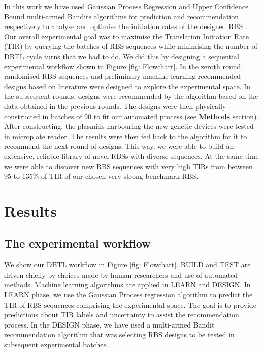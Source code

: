 \documentclass{article}
\begin{document}
In this work we have used Gaussian Process Regression \cite{Rasmussen2004} and Upper Confidence Bound multi-armed Bandits algorithms \cite{desautels2014parallelizing} for prediction and recommendation respectively to analyse and optimise the initiation rates of the designed RBS .
Our overall experimental goal was to maximise the Translation Initiation Rate (TIR) by querying the batches of RBS sequences while minimising the number of DBTL cycle turns that we had to do.
We did this by designing a sequential experimental workflow shown in Figure \ref{fig: Flowchart}.
In the zeroth round, randomised RBS sequences and preliminary machine learning recommended designs based on literature were designed to explore the experimental space. 
In the subsequent rounds, designs were recommended by the algorithm based on the data obtained in the previous rounds. 
The designs were then physically constructed in batches of 90 to fit our automated process (see \textbf{Methods} section).
After constructing, the plasmids harbouring the new genetic devices were tested in microplate reader.
The results were then fed back to the algorithm for it to recommend the next round of designs.
This way, we were able to build an extensive, reliable library of novel RBSs with diverse sequences.
At the same time we were able to discover new RBS sequences with very high TIRs from between 95 to 135\% of TIR of our chosen very strong benchmark RBS. 

\section{Results}

\subsection{The experimental workflow}

We show our DBTL workflow in Figure \ref{fig: Flowchart}.
BUILD and TEST are driven chiefly by choices made by human researchers and use of automated methods.
Machine learning algorithms are applied in LEARN and DESIGN.
In LEARN phase, we use the Gaussian Process regression algorithm to predict the TIR of RBS sequences comprising the experimental space.
The goal is to provide predictions about TIR labels and uncertainty to assist the recommendation process.
In the DESIGN phase, we have used a multi-armed Bandit recommendation algorithm that was selecting RBS designs to be tested in subsequent experimental batches.\\
\end{document}
